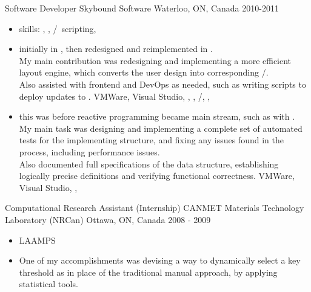 \cventry
  {Software Developer} %
  {Skybound Software} %
  {Waterloo, ON, Canada} %
  {2010-2011} %
  {
    \begin{itemize} %
      \liststyle
      \item {skills: \rfcsharp, \rftypescript, \rfhtml/\rfcss \rfbash \ scripting, \rfaws}
      \item{ initially in \rfcsharp, then redesigned and reimplemented in \rftypescript. 
      \\My main contribution was redesigning and implementing a more efficient layout engine, which converts the user design into corresponding \rfhtml/\rfcss.
      \\Also assisted with frontend and DevOps as needed, such as writing \rfbash scripts to deploy updates to \rfaws.
      \tgskills VMWare, Visual Studio, \rfcsharp, \rftypescript, \rfhtml/\rfcss, \rfbash, \rfaws
      }

      \item{
      this was before reactive programming became main stream, such as with \rfreact.
      \\My main task was designing and implementing a complete set of automated tests for the implementing structure, and fixing any issues found in the process, including performance issues. 
      \\Also documented full specifications of the data structure, establishing logically precise definitions and verifying functional correctness.
      \tgskills VMWare, Visual Studio, \rfcsharp, \rflatex

      }
    \end{itemize}
  }

\cventry
  {Computational Research Assistant (Internship)} %
  {CANMET Materials Technology Laboratory (NRCan)} %
  {Ottawa, ON, Canada} %
  {2008 - 2009} %
  {
    \begin{itemize} %
      \liststyle
      \item {LAAMPS}
      \item {One of my accomplishments was devising a way to dynamically select a key threshold as in place of the traditional manual approach, by applying statistical tools. }
    \end{itemize}
  }



